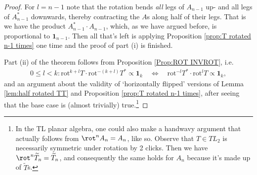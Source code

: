\begin{theorem}
\begin{proof}
For $l=n-1$ note that the rotation bends \emph{all} legs of $A_{n-1}$ up- and all legs of $A_{n-1}^*$ downwards, thereby contracting the $A$s along half of their legs. That is we have the product $A_{n-1}^*\cdot  A_{n-1}$, which, as we have argued before, is proportional to $\mathbf{1}_{n-1}$. Then all that's left is applying \textsf{Proposition \ref{prop:T rotated n-1 times}} one time and the proof of part (i) is finished.

\bigskip
Part (ii) of the theorem follows from \textsf{Proposition \ref{Prop:ROT INVROT}}, i.e.\
\begin{align*}
0\leq l <k : \mathrm{rot}^{k+l} T\cdot\mathrm{rot}^{-(k+l)}T^* \propto \mathbf{1}_k \quad\iff\quad \mathrm{rot}^{-l}T^* \cdot \mathrm{rot}^{l} T\propto \mathbf{1}_k,
\end{align*}
and an argument about the validity of `horizontally flipped' versions of \textsf{Lemma \ref{lem:half rotated  TT}} and \textsf{Proposition \ref{prop:T rotated n-1 times}}, after seeing that the base case is (almost trivially) true.\footnote{In the TL planar algebra, one could also make a handwavy argument that actually follows from $\rot^n A_n = A_n$, like so. Observe that $T\in TL_2$ is necessarily symmetric under rotation by 2 clicks. Then we have $\rot^n\widetilde{T}_n = \widetilde{T}_n$, and consequently the same holds for $A_n$ because it's made up of $\widetilde{T}$s.} 
\end{proof}
\end{theorem}

